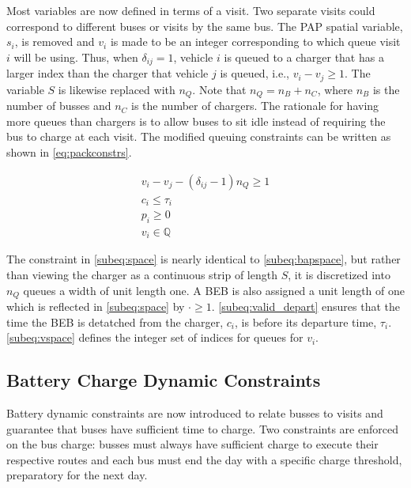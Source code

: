 Most variables are now defined in terms of a visit. Two separate visits could correspond to different buses or visits by
the same bus. The PAP spatial variable, $s_i$, is removed and $v_i$ is made to be an integer corresponding to which
queue visit $i$ will be using. Thus, when $\delta_{ij} = 1$, vehicle $i$ is queued to a charger that has a larger index than
the charger that vehicle $j$ is queued, i.e., $v_i-v_j \geq 1$. The variable $S$ is likewise replaced with $n_Q$. Note that
$n_Q = n_B + n_C$, where $n_B$ is the number of busses and $n_C$ is the number of chargers. The rationale for having
more queues than chargers is to allow buses to sit idle instead of requiring the bus to charge at each visit. The
modified queuing constraints can be written as shown in \autoref{eq:packconstrs}.

\begin{subequations}
\label{eq:packconstrs}
\begin{align}
    v_i - v_j - (\delta_{ij} - 1)n_Q \geq 1       \label{subeq:space}        \\
    c_i \leq \tau_i                             \label{subeq:valid_depart} \\
    p_i \geq 0                               \label{subeq:pos_charge} \\
    v_i \in \mathbb{Q}                       \label{subeq:vspace}
\end{align}
\end{subequations}

The constraint in \autoref{subeq:space} is nearly identical to \autoref{subeq:bapspace}, but rather than viewing the
charger as a continuous strip of length $S$, it is discretized into $n_Q$ queues a width of unit length one. A BEB is
also assigned a unit length of one which is reflected in \autoref{subeq:space} by $\cdot \geq 1$. \autoref{subeq:valid_depart}
ensures that the time the BEB is detatched from the charger, $c_i$, is before its departure time, $\tau_i$.
\autoref{subeq:vspace} defines the integer set of indices for queues for $v_i$.

\subsection{Battery Charge Dynamic Constraints}
\label{sec:batt_dynamics}
Battery dynamic constraints are now introduced to relate busses to visits and guarantee that buses have sufficient time
to charge. Two constraints are enforced on the bus charge: busses must always have sufficient charge to execute their
respective routes and each bus must end the day with a specific charge threshold, preparatory for the next day.

